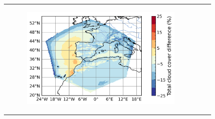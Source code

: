 \begin{figure}[htbp]
\begin{tabular}{ccc}
\begin{subfigure}[b]{0.33\textwidth}
            \includegraphics[width=\textwidth]{images/chap4/domain_size/diff_map_cldt_era_LAM_2000km_NBP80.png}
        \end{subfigure} \\
        

\end{tabular}
\end{figure}
